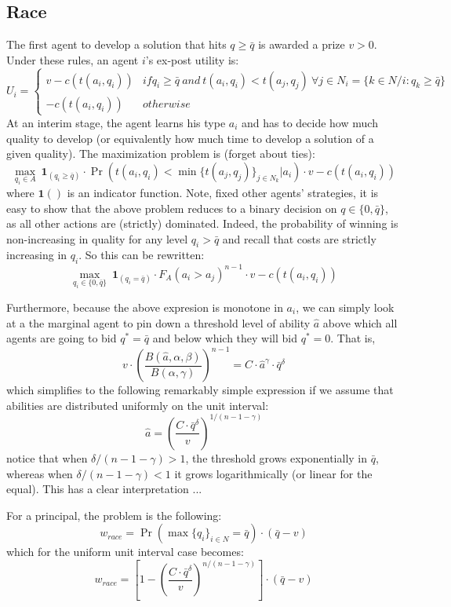 \documentclass[serif]{amsart}
\begin{document}
\subsection{Race}
The first agent to develop a solution that hits $q\geq \bar q$ is awarded a prize $v>0$.
Under these rules, an agent $i$'s ex-post utility is:
\[
U_i = \left\{  
	\begin{array}{cl}
		v - c(t(a_i,q_i)) & if q_i \geq \bar q ~ and ~ t(a_i,q_i) < t(a_j,q_j)~\forall j \in N_i =\{k \in N/{i}:q_k\geq\bar q\} \\
		-  c(t(a_i,q_i))  & otherwise 	
	\end{array}
\right.
\] 
At an interim stage, the agent learns his type $a_i$ and has to decide how much quality to develop (or equivalently how much time to develop a solution of a given quality).
The maximization problem is (forget about ties): 
\[
	\max_{q_i\in A} ~ \mathbf{1}_{(q_i\geq \bar q)}\cdot \Pr( t(a_i,q_i) < \min\{t(a_j,q_j)\}_{j \in N_k} | a_i ) \cdot v - c(t(a_i,q_i))
\]
where $\mathbf{1}()$ is an indicator function.
Note, fixed other agents' strategies, it is easy to show that the above problem reduces to a binary decision on $q\in\{0,\bar q\}$, as all other actions are (strictly) dominated. Indeed, the probability of winning is non-increasing in quality for any level $q_i>\bar q$ and recall that costs are strictly increasing in $q_i$. So this can be rewritten:
\[
	\max_{q_i\in \{0,\bar q\}} ~ \mathbf{1}_{(q_i = \bar q)}\cdot F_{A}(a_i > a_j)^{n-1} \cdot v - c(t(a_i,q_i))
\]

Furthermore, because the above expresion is monotone in $a_i$, we can simply look at a the marginal agent to pin down a threshold level of ability $\hat a$ above which all agents are going to bid $q^* = \bar q$ and below which they will bid $q^* = 0$. That is,
\[
	v \cdot \left( \frac{B(\hat a,\alpha,\beta)}{B(\alpha,\gamma)}\right)^{n-1}  = C \cdot \hat a^{\gamma} \cdot \bar q^{\delta}   
\]
which simplifies to the following remarkably simple expression if we assume that abilities are distributed uniformly on the unit interval:
\[
	 \hat a  = \left( \frac {C \cdot \bar q ^\delta}{v}\right)^{1/(n-1-\gamma)}
\]
notice that when $\delta / (n-1-\gamma) > 1 $, the threshold grows exponentially in $\bar q$, whereas when $\delta / (n-1-\gamma) <1 $ it grows logarithmically (or linear for the equal). This has a clear interpretation ... 
 

For a principal, the problem is the following:
\[
	w_{race} =  \Pr(\max \{q_i\}_{i \in N } = \bar q)\cdot (\bar q - v)
\]
which for the uniform unit interval case becomes:
\[
	w_{race} =  \left[ 1 -  \left(\frac{C \cdot \bar q ^\delta}{v}\right)^{n/(n-1-\gamma)}  \right] \cdot (\bar q - v)
\]
\end{document}

